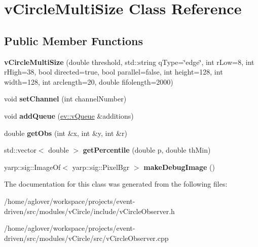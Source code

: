 \hypertarget{classvCircleMultiSize}{}\section{v\+Circle\+Multi\+Size Class Reference}
\label{classvCircleMultiSize}
\subsection*{Public Member Functions}
\begin{DoxyCompactItemize}
\item 
{\bfseries v\+Circle\+Multi\+Size} (double threshold, std\+::string q\+Type=\char`\"{}edge\char`\"{}, int r\+Low=8, int r\+High=38, bool directed=true, bool parallel=false, int height=128, int width=128, int arclength=20, double fifolength=2000)\hypertarget{classvCircleMultiSize_aa3e7373ef68728fab536417c491e35a4}{}\label{classvCircleMultiSize_aa3e7373ef68728fab536417c491e35a4}

\item 
void {\bfseries set\+Channel} (int channel\+Number)\hypertarget{classvCircleMultiSize_afe4c5983834ed7d5fa097fcc9677d234}{}\label{classvCircleMultiSize_afe4c5983834ed7d5fa097fcc9677d234}

\item 
void {\bfseries add\+Queue} (\hyperlink{classev_1_1vQueue}{ev\+::v\+Queue} \&additions)\hypertarget{classvCircleMultiSize_a101a1960c5012a83e03b9fdd8276f263}{}\label{classvCircleMultiSize_a101a1960c5012a83e03b9fdd8276f263}

\item 
double {\bfseries get\+Obs} (int \&x, int \&y, int \&r)\hypertarget{classvCircleMultiSize_a661f425152259951f87167bdcd53caaf}{}\label{classvCircleMultiSize_a661f425152259951f87167bdcd53caaf}

\item 
std\+::vector$<$ double $>$ {\bfseries get\+Percentile} (double p, double th\+Min)\hypertarget{classvCircleMultiSize_a92b94e14acce928e07922809a45cd5c0}{}\label{classvCircleMultiSize_a92b94e14acce928e07922809a45cd5c0}

\item 
yarp\+::sig\+::\+Image\+Of$<$ yarp\+::sig\+::\+Pixel\+Bgr $>$ {\bfseries make\+Debug\+Image} ()\hypertarget{classvCircleMultiSize_a1dc2c81da6abc8aaaaedf0d169ad9671}{}\label{classvCircleMultiSize_a1dc2c81da6abc8aaaaedf0d169ad9671}

\end{DoxyCompactItemize}


The documentation for this class was generated from the following files\+:\begin{DoxyCompactItemize}
\item 
/home/aglover/workspace/projects/event-\/driven/src/modules/v\+Circle/include/v\+Circle\+Observer.\+h\item 
/home/aglover/workspace/projects/event-\/driven/src/modules/v\+Circle/src/v\+Circle\+Observer.\+cpp\end{DoxyCompactItemize}
